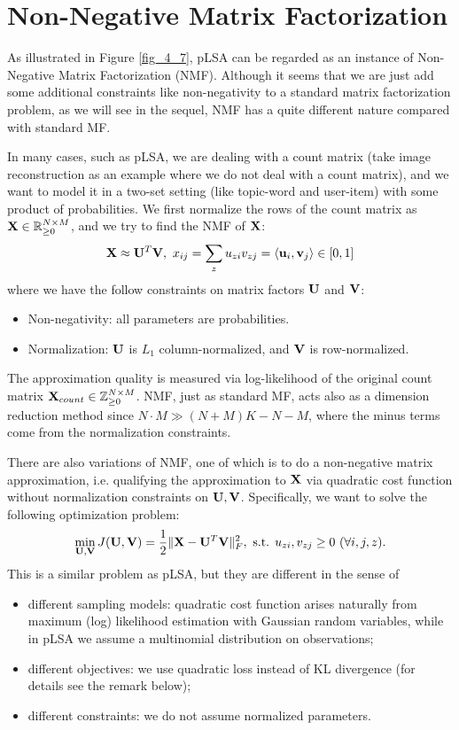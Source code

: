 \documentclass[../book-template.tex]{subfiles}
\begin{document}
\section{Non-Negative Matrix Factorization}
As illustrated in Figure \ref{fig_4_7}, pLSA can be regarded as an instance of Non-Negative Matrix Factorization (NMF). Although it seems that we are just add some additional constraints like non-negativity to a standard matrix factorization problem, as we will see in the sequel, NMF has a quite different nature compared with standard MF.
\par In many cases, such as pLSA, we are dealing with a count matrix (take image reconstruction as an example where we do not deal with a count matrix), and we want to model it in a two-set setting (like topic-word and user-item) with some product of probabilities. We first normalize the rows of the count matrix as ${\bf X}\in \mathbb{R}^{N\times M}_{\geq 0}$, and we try to find the NMF of ${\bf X}$:
\begin{equation*}
	{\bf X}\approx {\bf U}^T{\bf V},\ x_{ij}=\sum_{z}u_{zi}v_{zj}=\langle{\bf u}_i,{\bf v}_j\rangle\in [0,1]
\end{equation*}
where we have the follow constraints on matrix factors ${\bf U}$ and ${\bf V}$:
\begin{itemize}
	\item Non-negativity: all parameters are probabilities.
	\item Normalization: ${\bf U}$ is $L_1$ column-normalized, and ${\bf V}$ is row-normalized.
\end{itemize}
The approximation quality is measured via log-likelihood of the original count matrix ${\bf X}_{count}\in \mathbb{Z}^{N\times M}_{\geq 0}$. NMF, just as standard MF, acts also as a dimension reduction method since $N\cdot M\gg (N+M)K-N-M$, where the minus terms come from the normalization constraints.
\par There are also variations of NMF, one of which is to do a non-negative matrix approximation, i.e. qualifying the approximation to ${\bf X}$ via quadratic cost function without normalization constraints on ${\bf U,V}$. Specifically, we want to solve the following optimization problem:
\begin{equation}\label{eq_4_NMF_q_obj}
	\min_{{\bf U,V}}J({\bf U,V})=\frac{1}{2}\|{\bf X}-{\bf U}^T{\bf V}\|_F^2,\ \text{s.t. } u_{zi},v_{zj}\geq 0\ (\forall i,j,z).
\end{equation}
This is a similar problem as pLSA, but they are different in the sense of
\begin{itemize}
	\item different sampling models: quadratic cost function arises naturally from maximum (log) likelihood estimation with Gaussian random variables, while in pLSA we assume a multinomial distribution on observations;
	\item different objectives: we use quadratic loss instead of KL divergence (for details see the remark below);
	\item different constraints: we do not assume normalized parameters.
\end{itemize}
\end{document}
